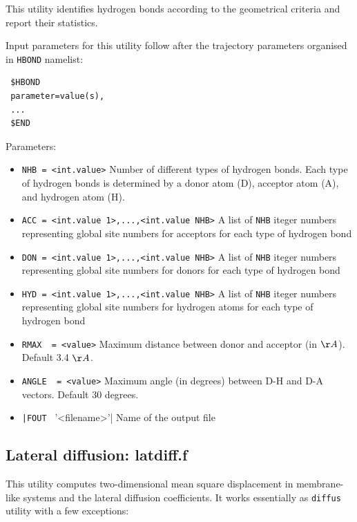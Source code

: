 \documentclass{article}
\begin{document}
This utility identifies hydrogen bonds according to the geometrical criteria and
report their statistics. 

Input parameters for this utility follow after the trajectory parameters
organised in \verb|HBOND| namelist:

\begin{verbatim}
 $HBOND
 parameter=value(s),
 ...
 $END
\end{verbatim}

Parameters:

\begin{itemize}

\item
  \verb|NHB = <int.value>|
  Number of different types of hydrogen bonds. Each type of hydrogen bonds is determined
  by a donor atom (D), acceptor atom (A),  and hydrogen atom (H).

\item   
  \verb|ACC = <int.value 1>,...,<int.value NHB>|
  A list of \verb|NHB| iteger numbers representing global site numbers for acceptors
  for each type of hydrogen bond

\item   
  \verb|DON = <int.value 1>,...,<int.value NHB>|
  A list of \verb|NHB| iteger numbers representing global site numbers for donors
  for each type of hydrogen bond

\item   
  \verb|HYD = <int.value 1>,...,<int.value NHB>|
  A list of \verb|NHB| iteger numbers representing global site numbers for hydrogen atoms
  for each type of hydrogen bond
  
\item
  \verb|RMAX  = <value>|
  Maximum distance between donor and acceptor (in $\AA$). Default 3.4 $\AA$.

\item
  \verb|ANGLE  = <value>|
  Maximum angle (in degrees) between D-H and D-A vectors. Default 30 degrees.

\item
  \verb=|FOUT = '<filename>'|
  Name of the output file

\end{itemize}  

\subsection{Lateral diffusion: latdiff.f}

This utility computes two-dimensional mean square displacement in
membrane-like systems and the lateral diffusion coefficients. It works
essentially as \verb|diffus| utility with a few exceptions:
\end{document}
